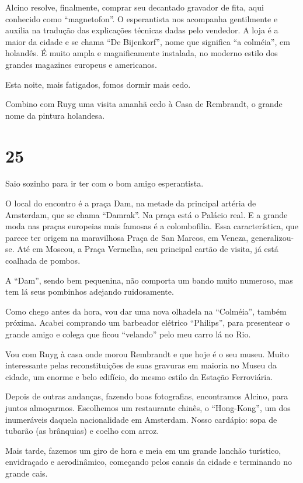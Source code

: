 Alcino resolve, finalmente, comprar seu decantado gravador de fita, aqui conhecido como ``magnetofon''. O esperantista nos acompanha gentilmente e auxilia na tradução das explicações técnicas dadas pelo vendedor. A loja é a maior da cidade e se chama ``De Bijenkorf'', nome que significa ``a colméia'', em holandês. É muito ampla e magnificamente instalada, no moderno estilo dos grandes magazines europeus e americanos.

Esta noite, mais fatigados, fomos dormir mais cedo.

Combino com Ruyg uma visita amanhã cedo à Casa de Rembrandt, o grande nome da pintura holandesa.

\section*{25 \adfflatleafright {}}
Saio sozinho para ir ter com o bom amigo esperantista.

O local do encontro é a praça Dam, na metade da principal artéria de Amsterdam, que se chama ``Damrak''. Na praça está o Palácio real. E a grande moda nas praças europeias mais famosas é a colombofilia. Essa característica, que parece ter origem na maravilhosa Praça de San Marcos, em Veneza, generalizou-se. Até em Moscou, a Praça Vermelha, seu principal cartão de visita, já está coalhada de pombos.

A ``Dam'', sendo bem pequenina, não comporta um bando muito numeroso, mas tem lá seus pombinhos adejando ruidosamente.

Como chego antes da hora, vou dar uma nova olhadela na ``Colméia'', também próxima. Acabei comprando um barbeador elétrico ``Philips'', para presentear o grande amigo e colega que ficou ``velando'' pelo meu carro lá no Rio.

Vou com Ruyg à casa onde morou Rembrandt e que hoje é o seu museu. Muito interessante pelas reconstituições de suas gravuras em maioria no Museu da cidade, um enorme e belo edifício, do mesmo estilo da Estação Ferroviária.

Depois de outras andanças, fazendo boas fotografias, encontramos Alcino, para juntos almoçarmos. Escolhemos um restaurante chinês, o ``Hong-Kong'', um dos inumeráveis daquela nacionalidade em Amsterdam. Nosso cardápio: sopa de tubarão (as brânquias) e coelho com arroz.

Mais tarde, fazemos um giro de hora e meia em um grande lanchão turístico, envidraçado e aerodinâmico, começando pelos canais da cidade e terminando no grande cais.

